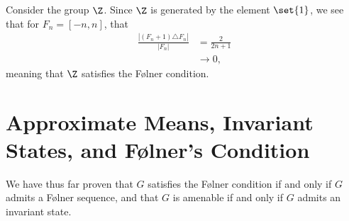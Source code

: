 \begin{example}
  Consider the group $\Z$. Since $\Z$ is generated by the element $\set{1}$, we see that for $F_n = [-n,n]$, that
  \begin{align*}
    \frac{\left\vert \left(F_n + 1\right)\triangle F_n \right\vert}{\left\vert F_n \right\vert} &= \frac{2}{2n+1}\\
                                                                                                &\rightarrow 0,
  \end{align*}
  meaning that $\Z$ satisfies the Følner condition.
\end{example}
\section{Approximate Means, Invariant States, and Følner's Condition}%
We have thus far proven that $G$ satisfies the Følner condition if and only if $G$ admits a Følner sequence, and that $G$ is amenable if and only if $G$ admits an invariant state.\newline

